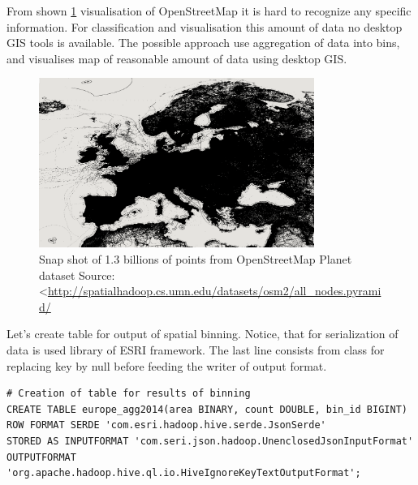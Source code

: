 \documentclass[a4paper,12pt,oneside]{report}
\begin{document}
	From shown \ref{map_eu} visualisation of OpenStreetMap it is hard to recognize any specific
		information. For classification  and visualisation this amount of data no
		desktop GIS tools is available. The possible approach use aggregation of data into bins, and
		visualises map of reasonable amount of data using desktop GIS.
		\begin{figure}[!htbp]
			\centering
			\includegraphics[width=0.8\textwidth]{./img/eu_all.png}
			\caption[GHF workflow]{\centering Snap shot of 1.3 billions of points from
			OpenStreetMap Planet dataset \newline
			Source: \textless\url{http://spatialhadoop.cs.umn.edu/datasets/osm2/all_nodes.pyramid/}}
			\label{map_eu}
		\end{figure}
	
Let's create table for output of spatial binning. Notice, that for serialization of data is used library of ESRI framework. 
	The last line consists from class for replacing key by null before feeding the writer of output format.
\begin{footnotesize}
	\begin{lstlisting}[style=python]
# Creation of table for results of binning
CREATE TABLE europe_agg2014(area BINARY, count DOUBLE, bin_id BIGINT)
ROW FORMAT SERDE 'com.esri.hadoop.hive.serde.JsonSerde'              
STORED AS INPUTFORMAT 'com.seri.json.hadoop.UnenclosedJsonInputFormat'
OUTPUTFORMAT 'org.apache.hadoop.hive.ql.io.HiveIgnoreKeyTextOutputFormat';
		\end{lstlisting}
	\end{footnotesize}
	
\end{document}

